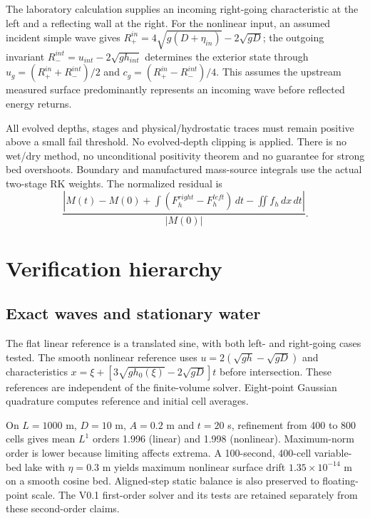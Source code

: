 \documentclass[11pt]{article}
\begin{document}
The laboratory calculation supplies an incoming right-going characteristic at
the left and a reflecting wall at the right. For the nonlinear input, an
assumed incident simple wave gives
$R_+^{in}=4\sqrt{g(D+\eta_{in})}-2\sqrt{gD}$; the outgoing invariant
$R_-^{int}=u_{int}-2\sqrt{gh_{int}}$ determines the exterior state through
$u_g=(R_+^{in}+R_-^{int})/2$ and
$c_g=(R_+^{in}-R_-^{int})/4$.
This assumes the upstream measured surface predominantly represents an incoming
wave before reflected energy returns.

All evolved depths, stages and physical/hydrostatic traces must remain positive
above a small fail threshold. No evolved-depth clipping is applied. There is no
wet/dry method, no unconditional positivity theorem and no guarantee for strong
bed overshoots. Boundary and manufactured mass-source integrals use the actual
two-stage RK weights. The normalized residual is
\begin{equation}
 \frac{\left|M(t)-M(0)+\int(F_h^{right}-F_h^{left})\,dt
 -\iint f_h\,dx\,dt\right|}{|M(0)|}.
\end{equation}

\section{Verification hierarchy}
\subsection{Exact waves and stationary water}
The flat linear reference is a translated sine, with both left- and right-going
cases tested. The smooth nonlinear reference uses
$u=2(\sqrt{gh}-\sqrt{gD})$ and characteristics
$x=\xi+[3\sqrt{gh_0(\xi)}-2\sqrt{gD}]t$ before intersection. These references
are independent of the finite-volume solver. Eight-point Gaussian quadrature
computes reference and initial cell averages.

On $L=1000$ m, $D=10$ m, $A=0.2$ m and $t=20$ s, refinement from 400 to
800 cells gives mean $L^1$ orders 1.996 (linear) and 1.998 (nonlinear).
Maximum-norm order is lower because limiting affects extrema.
A 100-second, 400-cell variable-bed lake with $\eta=0.3$ m yields maximum
nonlinear surface drift $1.35\times10^{-14}$ m on a smooth cosine bed.
Aligned-step static balance is also preserved to floating-point scale.
The V0.1 first-order solver and its tests are retained separately from these
second-order claims.
\end{document}
